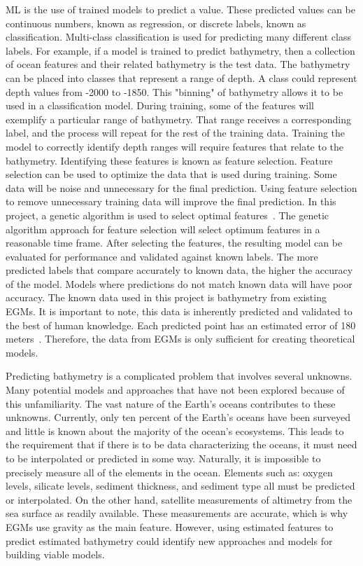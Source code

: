 \par
\ac{ML} is the use of trained models to predict a value.
These predicted values can be continuous numbers, known as regression, or discrete labels, known as classification.
Multi-class classification is used for predicting many different class labels.
For example, if a model is trained to predict bathymetry, then a collection of ocean features and their related bathymetry is the test data.
The bathymetry can be placed into classes that represent a range of depth.
A class could represent depth values from -2000 to -1850.
This "binning" of bathymetry allows it to be used in a classification model.
During training, some of the features will exemplify a particular range of bathymetry.
That range receives a corresponding label, and the process will repeat for the rest of the training data.
Training the model to correctly identify depth ranges will require features that relate to the bathymetry.
Identifying these features is known as feature selection.
Feature selection can be used to optimize the data that is used during training.
Some data will be noise and unnecessary for the final prediction.
Using feature selection to remove unnecessary training data will improve the final prediction.
In this project, a genetic algorithm is used to select optimal features~\cite{yang1998feature}.
The genetic algorithm approach for feature selection will select optimum features in a reasonable time frame.
After selecting the features, the resulting model can be evaluated for performance and validated against known labels.
The more predicted labels that compare accurately to known data, the higher the accuracy of the model.
Models where predictions do not match known data will have poor accuracy.
The known data used in this project is bathymetry from existing \ac{EGM}s.
It is important to note, this data is inherently predicted and validated to the best of human knowledge.
Each predicted point has an estimated error of 180 meters~\cite{becker2009global}.
Therefore, the data from \ac{EGM}s is only sufficient for creating theoretical models.

\par
Predicting bathymetry is a complicated problem that involves several unknowns.
Many potential models and approaches that have not been explored because of this unfamiliarity.
The vast nature of the Earth's oceans contributes to these unknowns.
Currently, only ten percent of the Earth's oceans have been surveyed and little is known about the majority of the ocean's ecosystems.
This leads to the requirement that if there is to be data characterizing the oceans, it must need to be interpolated or predicted in some way.
Naturally, it is impossible to precisely measure all of the elements in the ocean.
Elements such as: oxygen levels, silicate levels, sediment thickness, and sediment type all must be predicted or interpolated.
On the other hand, satellite measurements of altimetry from the sea surface as readily available.
These measurements are accurate, which is why \ac{EGM}s use gravity as the main feature.
However, using estimated features to predict estimated bathymetry could identify new approaches and models for building viable models.

